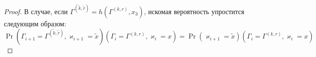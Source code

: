 \documentclass[a4paper,12pt,russian]{extarticle}
\begin{document}
\begin{proof}
В случае, если $\Gamma^{(\tilde{k},\tilde{r})}=h(\Gamma^{(k,r)},x_3)$, искомая вероятность упростится следующим образом:
\begin{equation*}
\Pr (\Gamma_{i+1}=\Gamma^{(\tilde{k},\tilde{r})},\varkappa_{i+1}=\tilde{x})(\Gamma_{i}=\Gamma^{(k,r)},\varkappa_i=x) 
=\Pr (\varkappa_{i+1}=\tilde{x})(\Gamma_{i}=\Gamma^{(k,r)},\varkappa_i=x) 
\end{equation*}


\end{proof}
\end{document}
